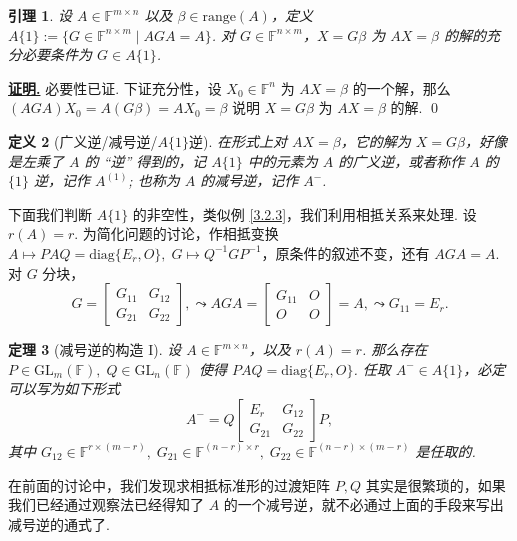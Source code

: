 \documentclass[10pt,openany]{article}
\theoremstyle{thmstyle} %
\newtheorem{theorem}{定理}[subsection]
\theoremstyle{defstyle} %
\newtheorem{definition}[theorem]{定义}
\newtheorem{lemma}[theorem]{引理}
\theoremstyle{prostyle} %
\theoremstyle{exastyle}
\theoremstyle{remstyle}
\renewenvironment{proof}[1][证明]{\par\underline{\textbf{#1.}} \;\fangsong}{\qed\par}
\newcommand{\F}{\mathbb{F}}
\newcommand{\gfn}{\text{GL}_n(\mathbb{F})}
\newcommand{\gfm}{\text{GL}_m(\mathbb{F})}
\newcommand{\mn}{^{m \times n}}
\newcommand{\nm}{^{n \times m}}
\newcommand{\diag}{\mathrm{diag}}
\begin{document}
\begin{lemma} \label{3.3.1}
	设 \( A \in \F\mn \) 以及 \( \beta \in \text{range}(A) \)，定义 \( A\{1\}:=\{G \in \F\nm \mid AGA=A \} \). 对 \( G \in \F\nm \)，\( X=G\beta \) 为 \( AX=\beta \) 的解的充分必要条件为 \( G \in A\{1\} \).
\end{lemma}

\begin{proof}
	必要性已证. 下证充分性，设 \( X_0 \in \F^n \) 为 \( AX=\beta \) 的一个解，那么 \( (AGA)X_0=A(G\beta)=AX_0=\beta \) 说明 \( X=G\beta \) 为 \( AX=\beta \) 的解. 
\end{proof}

\begin{definition}[广义逆/减号逆/\(A\{1\}\)逆] \label{3.3.2}
	在形式上对 \( AX=\beta \)，它的解为 \( X=G\beta \)，好像是左乘了 \( A \) 的 “逆” 得到的，记 \( A\{1\} \) 中的元素为 \( A \) 的广义逆，或者称作 \( A \) 的 \( \{1\} \) 逆，记作 \( A^{(1)} \); 也称为 \( A \) 的减号逆，记作 \( A^{-} \).
\end{definition}

下面我们判断 \( A\{1\} \) 的非空性，类似例 \ref{3.2.3}，我们利用相抵关系来处理. 设 \( r(A)=r \). 为简化问题的讨论，作相抵变换 \( A \mapsto PAQ=\diag\{E_r,O\}, \; G \mapsto Q^{-1}GP^{-1} \)，原条件的叙述不变，还有 \( AGA=A \). 对 \( G \) 分块，
\[ G=\begin{bmatrix}
	G_{11} & G_{12} \\
	G_{21} & G_{22}
\end{bmatrix}, \leadsto AGA=\begin{bmatrix}
G_{11} & O \\
O & O
\end{bmatrix}=A, \leadsto G_{11}=E_r. \]

\begin{theorem}[减号逆的构造 I] \label{3.3.3}
	设 \( A \in \F\mn \)，以及 \( r(A)=r \). 那么存在 \( P \in \gfm, \; Q \in \gfn \) 使得 \( PAQ=\diag\{E_r,O\} \). 任取 \( A^{-} \in A\{1\} \)，必定可以写为如下形式
	\[ A^{-}=Q\begin{bmatrix}
		E_r & G_{12} \\
		G_{21} & G_{22}
	\end{bmatrix}P, \]
	其中 \( G_{12} \in \F^{r \times (m-r)}, \; G_{21} \in \F^{(n-r) \times r}, \; G_{22} \in \F^{(n-r) \times (m-r)} \) 是任取的.
\end{theorem}

在前面的讨论中，我们发现求相抵标准形的过渡矩阵 \( P,Q \) 其实是很繁琐的，如果我们已经通过观察法已经得知了 \( A \) 的一个减号逆，就不必通过上面的手段来写出减号逆的通式了.
\end{document}
